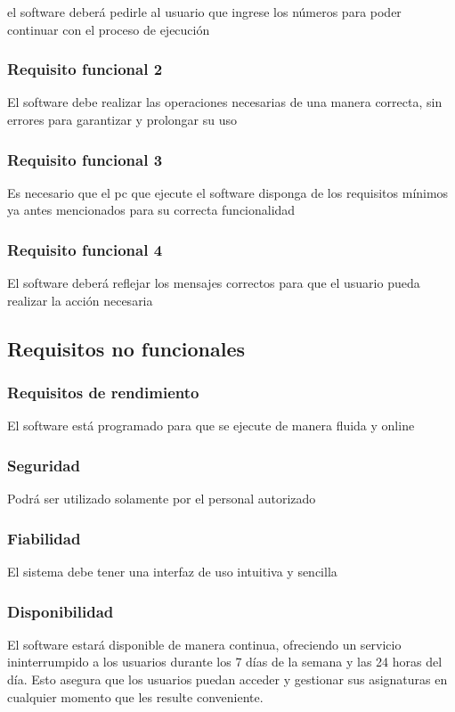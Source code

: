 \documentclass[11pt]{article}
\begin{document}
el software deberá pedirle al usuario que ingrese los números para
poder continuar con el proceso de ejecución

\subsubsection{Requisito funcional 2}

El software debe realizar las operaciones necesarias de una manera 
correcta, sin errores para garantizar y prolongar su uso

\subsubsection{Requisito funcional 3}

Es necesario que el pc que ejecute el software disponga de los 
requisitos mínimos ya antes mencionados para su correcta 
funcionalidad

\subsubsection{Requisito funcional 4}

El software deberá reflejar los mensajes correctos para que el 
usuario pueda realizar la acción necesaria

\subsection{\textbf{Requisitos no funcionales}}

\subsubsection{Requisitos de rendimiento}

El software está programado para que se ejecute de manera fluida y
online

\subsubsection{Seguridad}

Podrá ser utilizado solamente por el personal autorizado

\subsubsection{Fiabilidad}

El sistema debe tener una interfaz de uso intuitiva y sencilla

\subsubsection{Disponibilidad}

El software estará disponible de manera continua, ofreciendo un
servicio ininterrumpido a los usuarios durante los 7 días de la 
semana y las 24 horas del día. Esto asegura que los usuarios puedan
acceder y gestionar sus asignaturas en cualquier momento que les
resulte conveniente.
\end{document}
